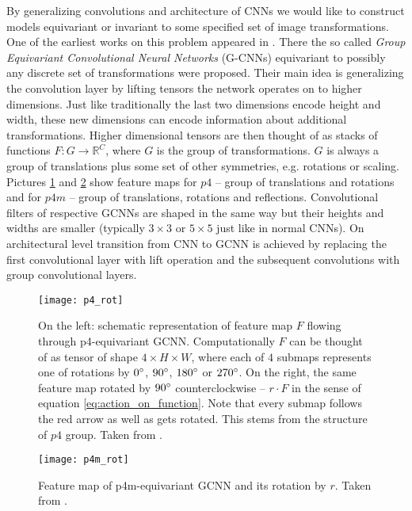     By generalizing convolutions and architecture of CNNs we would like to
    construct models
    equivariant or invariant to some specified set of image transformations.
    One of the earliest works on this problem appeared in \cite{cohen2016}. There
    the so called \textit{Group Equivariant Convolutional Neural Networks}
    (G-CNNs) equivariant to possibly any discrete set of transformations were
    proposed. Their main idea is generalizing the convolution layer by
    lifting tensors the network operates on to higher dimensions.
    Just like traditionally the last two
    dimensions encode height and width, these new dimensions can
    encode information about additional transformations. Higher
    dimensional tensors are then thought of as stacks of functions
    $F:G\to\mathbb{R}^C$, where $G$ is the group of transformations.
    $G$ is always a group of translations plus some set of other symmetries,
    e.g. rotations or scaling.
    Pictures \ref{fig:p4_rot} and \ref{fig:p4m_rot} show
    feature maps for $p4$ -- group of translations and rotations and for
    $p4m$ -- group of
    translations, rotations and reflections.
    Convolutional filters of respective GCNNs are shaped in the same way
    but their heights and widths are smaller (typically $3\times3$ or $5\times5$
    just like in normal CNNs). On architectural level transition from CNN to
    GCNN is achieved by replacing the first convolutional layer with lift
    operation and the subsequent convolutions with group convolutional layers.
    \begin{figure}[h]
        \centering
        \texttt{[image: p4\_rot]}
        \caption{On the left: schematic representation of feature map $F$ flowing through
            p4-equivariant GCNN. Computationally $F$ can be thought of as tensor of shape
            $4\times H \times W$, where each of $4$ submaps represents one of
            rotations by $0\degree$, $90\degree$, $180\degree$ or $270\degree$.
            On the right, the same feature map rotated by
            $90 \degree$ counterclockwise -- $r\cdot F$ in the sense of equation
            \ref{eq:action_on_function}. Note that every submap follows the
            red arrow as well as gets rotated. This stems from the structure of
            $p4$ group. Taken from \cite{cohen2016}.}
        \label{fig:p4_rot}
    \end{figure}
    \begin{figure}[h]
        \centering
        \texttt{[image: p4m\_rot]}
        \caption{Feature map of p4m-equivariant GCNN and its rotation by $r$.
                    Taken from \cite{cohen2016}.}
        \label{fig:p4m_rot}
    \end{figure}

